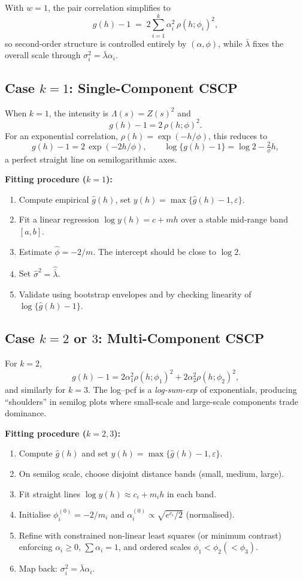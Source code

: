 \documentclass[11pt]{article}
\begin{document}
With $w=1$, the pair correlation simplifies to
\[
g(h)-1 \;=\; 2 \sum_{i=1}^k \alpha_i^2 \,\rho(h;\phi_i)^2,
\]
so second-order structure is controlled entirely by $(\alpha,\phi)$, while $\bar\lambda$ fixes the overall scale through $\sigma_i^2 = \bar\lambda \alpha_i$.

\subsection{Case $k=1$: Single-Component CSCP}\label{sec:cscp_k1}
When $k=1$, the intensity is $\Lambda(s)=Z(s)^2$ and
\[
g(h)-1 = 2\,\rho(h;\phi)^2.
\]
For an exponential correlation, $\rho(h)=\exp(-h/\phi)$, this reduces to
\[
g(h)-1 = 2\,\exp(-2h/\phi),
\qquad
\log\{g(h)-1\} = \log 2 - \tfrac{2}{\phi}h,
\]
a perfect straight line on semilogarithmic axes.  

\noindent\textbf{Fitting procedure ($k=1$):}
\begin{enumerate}
	\item Compute empirical $\hat g(h)$, set $y(h)=\max\{\hat g(h)-1,\varepsilon\}$.
	\item Fit a linear regression $\log y(h) = c + m h$ over a stable mid-range band $[a,b]$.
	\item Estimate $\hat\phi = -2/m$. The intercept should be close to $\log 2$.
	\item Set $\hat\sigma^2 = \hat{\bar\lambda}$.
	\item Validate using bootstrap envelopes and by checking linearity of $\log\{\hat g(h)-1\}$.
\end{enumerate}

\subsection{Case $k=2$ or $3$: Multi-Component CSCP}
For $k=2$,
\[
g(h)-1 = 2\alpha_1^2 \rho(h;\phi_1)^2 + 2\alpha_2^2 \rho(h;\phi_2)^2,
\]
and similarly for $k=3$. The log--pcf is a \emph{log-sum-exp} of exponentials, producing ``shoulders'' in semilog plots where small-scale and large-scale components trade dominance.

\noindent\textbf{Fitting procedure ($k=2,3$):}
\begin{enumerate}
	\item Compute $\hat g(h)$ and set $y(h)=\max\{\hat g(h)-1,\varepsilon\}$.
	\item On semilog scale, choose disjoint distance bands (small, medium, large).
	\item Fit straight lines $\log y(h) \approx c_i + m_i h$ in each band.
	\item Initialise $\phi_i^{(0)} = -2/m_i$ and $\alpha_i^{(0)} \propto \sqrt{e^{c_i}/2}$ (normalised).
	\item Refine with constrained non-linear least squares (or minimum contrast) enforcing $\alpha_i\ge 0$, $\sum \alpha_i=1$, and ordered scales $\phi_1<\phi_2(<\phi_3)$.
	\item Map back: $\sigma_i^2 = \bar\lambda \alpha_i$.
\end{enumerate}
\end{document}
